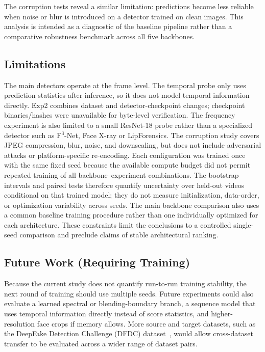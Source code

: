 \documentclass[pdflatex,sn-mathphys-num,iicol]{sn-jnl}
\begin{document}
The corruption tests reveal a similar limitation: predictions become less reliable when noise or blur is introduced on a detector trained on clean images. This analysis is intended as a diagnostic of the baseline pipeline rather than a comparative robustness benchmark across all five backbones.

\subsection{Limitations}
The main detectors operate at the frame level. The temporal probe only uses prediction statistics after inference, so it does not model temporal information directly. Exp2 combines dataset and detector-checkpoint changes; checkpoint binaries/hashes were unavailable for byte-level verification. The frequency experiment is also limited to a small ResNet-18 probe rather than a specialized detector such as F$^3$-Net, Face X-ray or LipForensics. The corruption study covers JPEG compression, blur, noise, and downscaling, but does not include adversarial attacks or platform-specific re-encoding. Each configuration was trained once with the same fixed seed because the available compute budget did not permit repeated training of all backbone--experiment combinations. The bootstrap intervals and paired tests therefore quantify uncertainty over held-out videos conditional on that trained model; they do not measure initialization, data-order, or optimization variability across seeds. The main backbone comparison also uses a common baseline training procedure rather than one individually optimized for each architecture. These constraints limit the conclusions to a controlled single-seed comparison and preclude claims of stable architectural ranking.

\subsection{Future Work (Requiring Training)}
Because the current study does not quantify run-to-run training stability, the next round of training should use multiple seeds. Future experiments could also evaluate a learned spectral or blending-boundary branch, a sequence model that uses temporal information directly instead of score statistics, and higher-resolution face crops if memory allows. More source and target datasets, such as the DeepFake Detection Challenge (DFDC) dataset~\cite{ref:dfdc}, would allow cross-dataset transfer to be evaluated across a wider range of dataset pairs.
\end{document}
